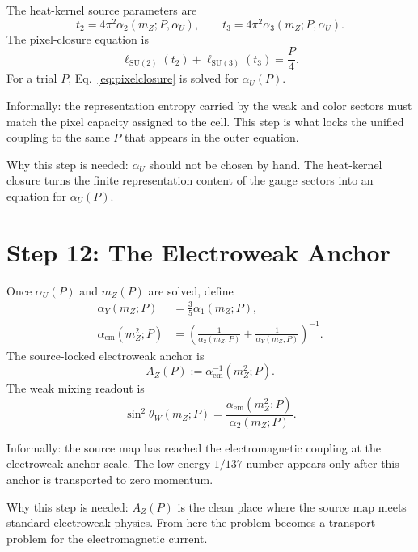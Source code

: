 \documentclass[11pt]{article}
\theoremstyle{remark}
\newcommand{\SU}{\mathrm{SU}}
\newcommand{\AZ}{A_Z}
\begin{document}
The heat-kernel source parameters are
\begin{equation}
t_2=4\pi^2\alpha_2(m_Z;P,\alpha_U),
\qquad
t_3=4\pi^2\alpha_3(m_Z;P,\alpha_U).
\label{eq:t23}
\end{equation}
The pixel-closure equation is
\begin{equation}
\boxed{
\bar\ell_{\SU(2)}(t_2)+\bar\ell_{\SU(3)}(t_3)=\frac{P}{4}.
}
\label{eq:pixelclosure}
\end{equation}
For a trial \(P\), Eq.~\eqref{eq:pixelclosure} is solved for \(\alpha_U(P)\).

Informally: the representation entropy carried by the weak and color sectors must match the pixel capacity assigned to the cell. This step is what locks the unified coupling to the same \(P\) that appears in the outer equation.

Why this step is needed: \(\alpha_U\) should not be chosen by hand. The heat-kernel closure turns the finite representation content of the gauge sectors into an equation for \(\alpha_U(P)\).

\section{Step 12: The Electroweak Anchor}

Once \(\alpha_U(P)\) and \(m_Z(P)\) are solved, define
\begin{align}
\alpha_Y(m_Z;P)&=\frac{3}{5}\alpha_1(m_Z;P),\\
\alpha_{\mathrm{em}}(m_Z^2;P)
&=
\left(
\frac{1}{\alpha_2(m_Z;P)}
+\frac{1}{\alpha_Y(m_Z;P)}
\right)^{-1}.
\label{eq:alphaem}
\end{align}
The source-locked electroweak anchor is
\begin{equation}
\boxed{
\AZ(P):=\alpha_{\mathrm{em}}^{-1}(m_Z^2;P).
}
\label{eq:AZ}
\end{equation}
The weak mixing readout is
\begin{equation}
\sin^2\theta_W(m_Z;P)=
\frac{\alpha_{\mathrm{em}}(m_Z^2;P)}{\alpha_2(m_Z;P)}.
\label{eq:sin2}
\end{equation}

Informally: the source map has reached the electromagnetic coupling at the electroweak anchor scale. The low-energy \(1/137\) number appears only after this anchor is transported to zero momentum.

Why this step is needed: \(\AZ(P)\) is the clean place where the source map meets standard electroweak physics. From here the problem becomes a transport problem for the electromagnetic current.
\end{document}
